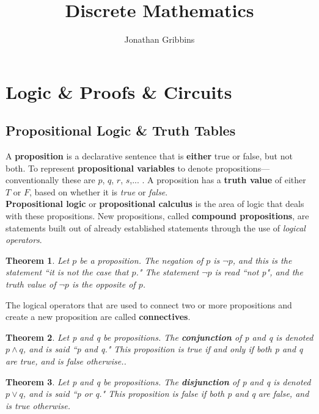 \documentclass[12pt,letterpaper]{article}
\author{Jonathan Gribbins}
\title{Discrete Mathematics}
\date{}
\newtheorem{theorem}{Theorem}
\begin{document}
\maketitle

\tableofcontents

\pagebreak

\section{Logic \& Proofs \& Circuits}

\subsection{Propositional Logic \& Truth Tables}

A \textbf{proposition} is a declarative sentence that is \textbf{either} true or false, but not both. To represent \textbf{propositional variables} to denote propositions---conventionally these are $p$, $q$, $r$, $s$,... . A proposition has a \textbf{truth value} of either $T$ or $F$, based on whether it is \textit{true} or \textit{false}. \\

\textbf{Propositional logic} or \textbf{propositional calculus} is the area of logic that deals with these propositions. New propositions, called \textbf{compound propositions}, are statements built out of already established statements through the use of \textit{logical operators}.

\begin{theorem}
	Let $p$ be a proposition. The negation of $p$ is $\lnot p$, and this is the statement ``it is not the case that $p$." The statement $\lnot p$ is read ``not p", and the truth value of $\lnot p$ is the opposite of $p$.
\end{theorem}

The logical operators that are used to connect two or more propositions and create a new proposition are called \textbf{connectives}. 

\begin{theorem}
	Let p and q be propositions. The \textbf{conjunction} of p and q is denoted $p\wedge q$, and is said ``p and q." This proposition is true if and only if both p and q are true, and is false otherwise..
\end{theorem}

\begin{theorem}
	Let p and q be propositions. The \textbf{disjunction} of p and q is denoted $p\vee q$, and is said ``p or q." This proposition is false if both p and q are false, and is true otherwise.
\end{theorem}
\end{document}

